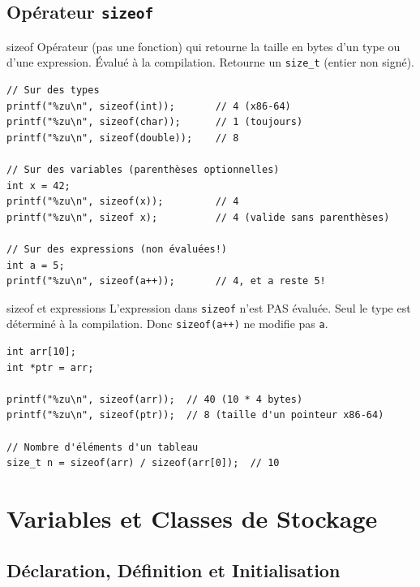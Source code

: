 \documentclass[10pt,a4paper]{article}
\begin{document}
\subsection{Opérateur \texttt{sizeof}}

\begin{definitionbox}{sizeof}
Opérateur (pas une fonction) qui retourne la taille en bytes d'un type ou d'une expression. Évalué à la compilation. Retourne un \texttt{size\_t} (entier non signé).
\end{definitionbox}

\begin{lstlisting}[caption={Utilisation de sizeof}]
// Sur des types
printf("%zu\n", sizeof(int));       // 4 (x86-64)
printf("%zu\n", sizeof(char));      // 1 (toujours)
printf("%zu\n", sizeof(double));    // 8

// Sur des variables (parenthèses optionnelles)
int x = 42;
printf("%zu\n", sizeof(x));         // 4
printf("%zu\n", sizeof x);          // 4 (valide sans parenthèses)

// Sur des expressions (non évaluées!)
int a = 5;
printf("%zu\n", sizeof(a++));       // 4, et a reste 5!
\end{lstlisting}

\begin{warningbox}{sizeof et expressions}
L'expression dans \texttt{sizeof} n'est PAS évaluée. Seul le type est déterminé à la compilation. Donc \texttt{sizeof(a++)} ne modifie pas \texttt{a}.
\end{warningbox}

\begin{lstlisting}[caption={sizeof et tableaux vs pointeurs}]
int arr[10];
int *ptr = arr;

printf("%zu\n", sizeof(arr));  // 40 (10 * 4 bytes)
printf("%zu\n", sizeof(ptr));  // 8 (taille d'un pointeur x86-64)

// Nombre d'éléments d'un tableau
size_t n = sizeof(arr) / sizeof(arr[0]);  // 10
\end{lstlisting}

\section{Variables et Classes de Stockage}

\subsection{Déclaration, Définition et Initialisation}
\end{document}
